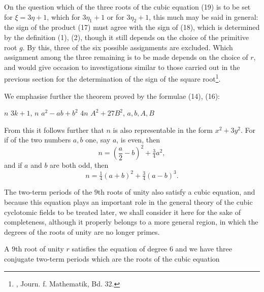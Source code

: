 On the question which of the three roots of the cubic
equation (19) is to be set for $\xi = 3\eta + 1$, which for $3\eta_1 + 1$ or for
$3\eta_2 + 1$, this much may be said in general: the sign of the
product (17) must agree with the sign of (18), which is determined
by the definition (1), (2), though it still depends on the choice
of the primitive root $g$. By this, three of the six possible
assignments are excluded. Which assignment among the three
remaining is to be made depends on the choice of $r$, and would
give occasion to investigations similar to those carried out in the
previous section for the determination of the sign of the square root\footnote{, Journ. f. Mathematik, Bd. 32.}.

We emphasise further the theorem proved by the formulae
(14), (16):

 $n$  $3k + 1$,  $n$ 
 $a^2 - ab + b^2$  $4n$ 
$A^2 + 27B^2$,  $a, b, A, B$ 

From this it follows further that $n$ is also representable in
the form $x^2 + 3y^2$. For if of the two numbers $a, b$ one,
say $a$, is even, then
\[
n = \left(\frac{a}{2} - b\right)^2 + \tfrac{3}{4}a^2,
\]
and if $a$ and $b$ are both odd, then
\[
n = \tfrac{1}{4}(a + b)^2 + \tfrac{3}{4}(a - b)^3. %
\]

The two-term periods of the $9$th roots of unity also
satisfy a cubic equation, and because this equation plays an
important role in the general theory of the cubic cyclotomic
fields to be treated later, we shall consider it here for the
sake of completeness, although it properly belongs to a more
general region, in which the degrees of the roots of unity
are no longer primes.

A $9$th root of unity $r$ satisfies the equation of degree $6$ %
and we have three conjugate two-term periods
which are the roots of the cubic equation
